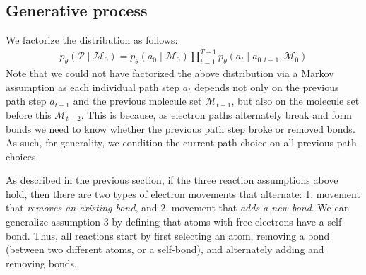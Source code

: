 \documentclass{article}
\newcommand{\Mc}{{\mathcal{M}}}
\newcommand{\Pc}{{\mathcal{P}}}
\begin{document}
\subsection{Generative process}
We factorize the distribution as follows:
\begin{align}
p_\theta(\Pc \mid \Mc_0) = p_\theta(a_{0} \mid \Mc_0) \prod_{t=1}^{T-1} p_\theta(a_{t} \mid a_{0:t-1}, \Mc_{0}) \nonumber
\end{align}
Note that we could not have factorized the above distribution via a Markov assumption as each individual path step $a_t$ depends not only on the previous path step $a_{t-1}$ and the previous molecule set $\Mc_{t-1}$, but also on the molecule set before this $\Mc_{t-2}$. This is because, as electron paths alternately break and form bonds we need to know whether the previous path step broke or removed bonds. As such, for generality, we condition the current path choice on all previous path choices.

As described in the previous section, if the three reaction assumptions above hold, then there are two types of electron movements that alternate: 1. movement that \emph{removes an existing bond}, and 2. movement that \emph{adds a new bond}. We can generalize assumption 3 by defining that atoms with free electrons have a self-bond. Thus, all reactions start by first selecting an atom, removing a bond (between two different atoms, or a self-bond), and alternately adding and removing bonds. %
\end{document}
